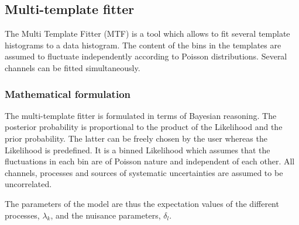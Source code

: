 \documentclass[11pt, a4paper]{article}
\begin{document}

\clearpage
\pagebreak

\subsection{Multi-template fitter}
\label{section:MTF}


The Multi Template Fitter (MTF) is a tool which allows to fit several
template histograms to a data histogram. The content of the bins in
the templates are assumed to fluctuate independently according to
Poisson distributions. Several channels can be fitted simultaneously.

\subsubsection{Mathematical formulation}
\label{section:math}

The multi-template fitter is formulated in terms of Bayesian reasoning. The
posterior probability is proportional to the product of the Likelihood
and the prior probability. The latter can be freely chosen by the user
whereas the Likelihood is predefined. It is a binned Likelihood which
assumes that the fluctuations in each bin are of Poisson nature and
independent of each other. All channels, processes and sources of
systematic uncertainties are assumed to be uncorrelated.

The parameters of the model are thus the expectation values of the
different processes, $\lambda_{k}$, and the nuisance parameters,
$\delta_{l}$.
\end{document}
